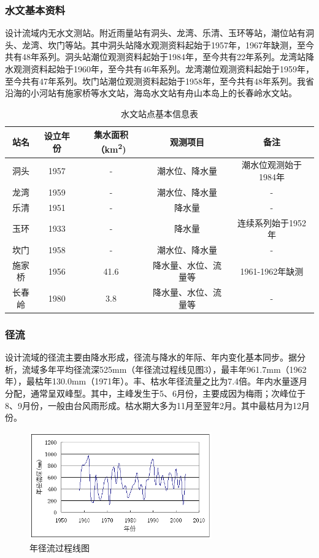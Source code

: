 \documentclass[UTF8, a4paper, 12pt]{ctexart} %
\begin{document}
\subsubsection{水文基本资料}
设计流域内无水文测站。附近雨量站有洞头、龙湾、乐清、玉环等站，潮位站有洞头、龙湾、坎门等站。其中洞头站降水观测资料起始于1957年，1967年缺测，至今共有48年系列。洞头站潮位观测资料起始于1984年，至今共有22年系列。龙湾站降水观测资料起始于1960年，至今共有46年系列。龙湾潮位观测资料起始于1959年，至今共有47年系列。坎门站潮位观测资料起始于1958年，至今共有48年系列。我省沿海的小河站有施家桥等水文站，海岛水文站有舟山本岛上的长春岭水文站。
\begin{table}[h]
    \centering
    \caption{水文站点基本信息表}
    \begin{tabular}{|c|c|c|c|c|}
        \hline
        站名 & 设立年份 & 集水面积（km\textsuperscript{2}) & 观测项目 & 备注 \\ \hline
        洞头 & 1957 & - & 潮水位、降水量 & 潮水位观测始于1984年 \\ \hline
        龙湾 & 1959 & - & 潮水位、降水量 & - \\ \hline
        乐清 & 1951 & - & 降水量 & - \\ \hline
        玉环 & 1933 & - & 降水量 & 连续系列始于1952年 \\ \hline
        坎门 & 1958 & - & 潮水位、降水量 & - \\ \hline
        施家桥 & 1956 & 41.6 & 降水量、水位、流量等 & 1961-1962年缺测 \\ \hline
        长春岭 & 1980 & 3.8 & 降水量、水位、流量等 & - \\ \hline
    \end{tabular}
    \label{tab:hydrological_stations}
\end{table}

\subsubsection{径流}
设计流域的径流主要由降水形成，径流与降水的年际、年内变化基本同步。据分析，流域多年平均径流深525mm（年径流过程线见图3），最丰年961.7mm（1962年），最枯年130.0mm（1971年）。丰、枯水年径流量之比为7.4倍。年内水量逐月分配，通常呈双峰型。其中，主峰发生于5、6月份，主要成因为梅雨；次峰位于8、9月份，一般由台风雨形成。枯水期大多为11月至翌年2月。其中最枯月为12月份。

\begin{figure}[h]
    \centering
    \includegraphics[width=0.7\textwidth]{3.png}
    \caption{年径流过程线图}
    \label{fig:annual_runoff_process}
\end{figure}
\end{document}
